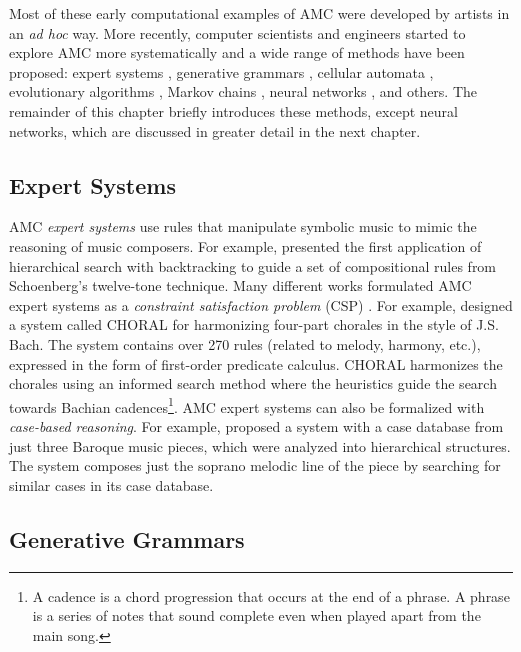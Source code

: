 Most of these early computational examples of AMC were developed by artists in an \textit{ad hoc} way. More recently, computer scientists and engineers started to explore AMC more systematically and a wide range of methods have been proposed: expert systems \cite{gill1963technique}, generative grammars \cite{cope1989experiments}, cellular automata \cite{miranda1993cellular}, evolutionary algorithms \cite{horner1991genetic}, Markov chains \cite{hild1992harmonet}, neural networks \cite{todd1989connectionist}, and others. The remainder of this chapter briefly introduces these methods, except neural networks, which are discussed in greater detail in the next chapter.

\subsection{Expert Systems}

AMC \textit{expert systems} use rules that manipulate symbolic music to mimic the reasoning of music composers. For example, \citet{gill1963technique} presented the first application of hierarchical search with backtracking to guide a set of compositional rules from Schoenberg's twelve-tone technique. Many different works formulated AMC expert systems as a \textit{constraint satisfaction problem} (CSP) \cite{anders2011constraint}. For example, \citet{ebciouglu1988expert} designed a system called CHORAL for harmonizing four-part chorales in the style of J.S. Bach. The system contains over 270 rules (related to melody, harmony, etc.), expressed in the form of first-order predicate calculus. CHORAL harmonizes the chorales using an informed search method where the heuristics guide the search towards Bachian cadences\footnote{A cadence is a chord progression that occurs at the end of a phrase. A phrase is a series of notes that sound complete even when played apart from the main song.}. AMC expert systems can also be formalized with \textit{case-based reasoning}. For example, \citet{pereira1997composing} proposed a system with a case database from just three Baroque music pieces, which were analyzed into hierarchical structures. The system composes just the soprano melodic line of the piece by searching for similar cases in its case database.

\subsection{Generative Grammars}

